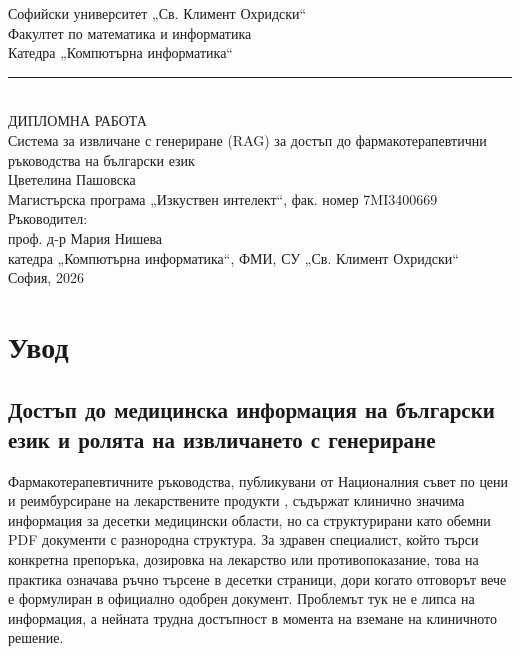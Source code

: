 \documentclass[12pt,a4paper]{article}
\let\origsection\section
\renewcommand{\section}{\clearpage\origsection}
\begin{document}
\begin{titlepage}
\centering
\large Софийски университет „Св. Климент Охридски“\\
Факултет по математика и информатика\\
Катедра „Компютърна информатика“\\[2cm]
\rule{\textwidth}{0.4pt}\\[2cm]
{\LARGE ДИПЛОМНА РАБОТА}\\[1cm]
{\Large Система за извличане с генериране (RAG) за достъп до фармакотерапевтични ръководства на български език}\\[2cm]
Цветелина Пашовска\\
Магистърска програма „Изкуствен интелект“, фак. номер 7MI3400669\\[2cm]
Ръководител:\\
проф. д-р Мария Нишева\\
катедра „Компютърна информатика“, ФМИ, СУ „Св. Климент Охридски“\\
\vfill
София, 2026
\end{titlepage}

\begingroup
\setlength{\parskip}{0pt}
\tableofcontents
\endgroup

\section{Увод}

\subsection{Достъп до медицинска информация на български език и ролята на извличането с генериране}
\label{sec:motivation}
Фармакотерапевтичните ръководства, публикувани от Националния съвет по цени и реимбурсиране на лекарствените продукти \cite{ncpr_guidelines}, съдържат клинично значима информация за десетки медицински области, но са структурирани като обемни PDF документи с разнородна структура. За здравен специалист, който търси конкретна препоръка, дозировка на лекарство или противопоказание, това на практика означава ръчно търсене в десетки страници, дори когато отговорът вече е формулиран в официално одобрен документ. Проблемът тук не е липса на информация, а нейната трудна достъпност в момента на вземане на клиничното решение.
\end{document}
